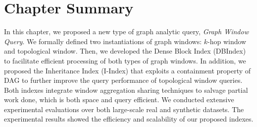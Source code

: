 \section{Chapter Summary}
In this chapter, we proposed a new type of graph analytic query, \emph{Graph Window Query}. We formally defined two instantiations of graph windows: $k$-hop window and topological window. Then, we developed the Dense Block Index (DBIndex) to facilitate efficient processing of both types of graph windows. In addition, we proposed the Inheritance Index (I-Index) that exploits a containment property of DAG to further improve the query performance of topological window queries. Both indexes integrate window aggregation sharing techniques to salvage partial work done, which is both space and query efficient. We conducted extensive experimental evaluations over both large-scale real and synthetic datasets. The experimental results showed the efficiency and scalability of our proposed indexes. 


